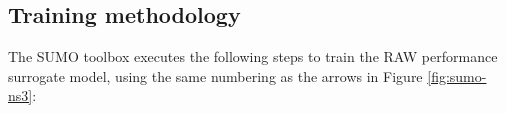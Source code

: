  





\subsection{Training methodology \label{subs:raw_training}}




The SUMO toolbox executes the following steps to train the RAW performance surrogate model, using the same numbering as the arrows in Figure \ref{fig:sumo-ns3}:

